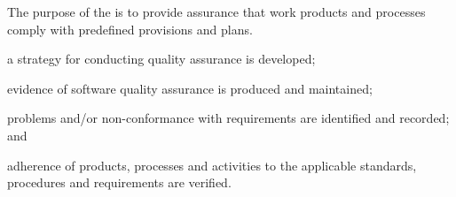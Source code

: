 			\begin{adjustwidth}{2em}{0pt} 

				The purpose of the  is to provide assurance that work products and processes comply with predefined provisions and plans.

			\end{adjustwidth}

			\begin{adjustwidth}{2em}{0pt} 

				\begin{compactitem}

					\item a strategy for conducting quality assurance is developed;

					\item evidence of software quality assurance is produced and maintained;

					\item problems and/or non-conformance with requirements are identified and recorded; and

					\item adherence of products, processes and activities to the applicable standards, procedures and requirements are verified.

				\end{compactitem}

			\end{adjustwidth}

